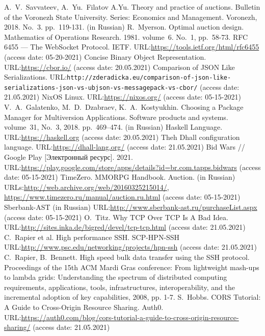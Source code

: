 \documentclass[
]{ceurart}
\begin{document}
\begin{thebibliography}{99}
    A.~V.~Savvateev, A.~Yu.~Filatov A.Yu. Theory and practice of auctions. Bulletin of the Voronezh State University. Series: Economics and Management. Voronezh, 2018. No.~3. pp.~119-131. (in Russian)
    R.~Myerson. Optimal auction design. Mathematics of Operations Research. 1981. volume~6. No.~1, pp.~58-73. 
    RFC 6455 — The WebSocket Protocol. IETF. URL:\url{https://tools.ietf.org/html/rfc6455} (access date: 05-20-2021)
    Concise Binary Object Representation. URL:\url{https://cbor.io/} (access date: 20.05.2021)
    Comparison of JSON Like Serializations. URL:\texttt{http://zderadicka.eu/comparison-of-json-like-serializations-json-vs-ubjson-vs-messagepack-vs-cbor/} (access date: 21.05.2021)
    NixOS Linux. URL:\url{https://nixos.org/} (access date: 05-15-2021)
    V.~A.~Galatenko, M.~D.~Dzabraev, K.~A.~Kostyukhin. Choosing a Package Manager for Multiversion Applications. Software products and systems. volume~31, No.~3, 2018. pp.~469–474. (in Russian) 
    Haskell Language. URL:\url{https://haskell.org} (access date: 20.05.2021)
    Theh Dhall configuration language. URL:\url{https://dhall-lang.org/} (access date: 21.05.2021)
    Bid Wars // Google Play [Электронный ресурс]. 2021. URL:\url{https://play.google.com/store/apps/details?id=br.com.tapps.bidwars} (access date: 05-15-2021)
    TimeZero. MMORPG Handbook. Auction. (in Russian) URLs:\url{http://web.archive.org/web/20160325215014/}, \url{https://www.timezero.ru/manual/auction.ru.html} (access date: 05-15-2021)
    Sberbank-AST (in Russian) URL:\url{http://www.sberbank-ast.ru/purchaseList.aspx} (access date: 05-15-2021)
    O.~Titz. Why TCP Over TCP Is A Bad Idea. URL:\url{http://sites.inka.de/bigred/devel/tcp-tcp.html} (access date: 21.05.2021)
    C.~Rapier et al. High performance SSH. SCP-HPN-SSH URL:\url{http://www.psc.edu/networking/projects/hpn-ssh} (access date: 21.05.2021)
    C.~Rapier, B.~Bennett. High speed bulk data transfer using the SSH protocol. Proceedings of the 15th ACM Mardi Gras conference: From lightweight mash-ups to lambda grids: Understanding the spectrum of distributed computing requirements, applications, tools, infrastructures, interoperability, and the incremental adoption of key capabilities, 2008,  pp. 1-7. 
    S.~Hobbs. CORS Tutorial: A Guide to Cross-Origin Resource Sharing. Auth0. URL:\url{https://auth0.com/blog/cors-tutorial-a-guide-to-cross-origin-resource-sharing/} (access date: 21.05.2021)
\end{thebibliography}

\end{document}
